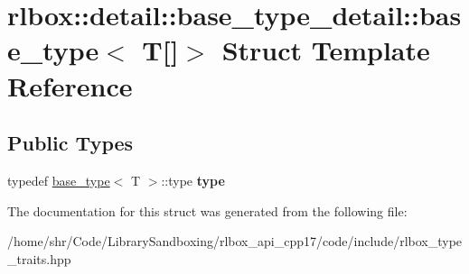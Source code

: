\hypertarget{structrlbox_1_1detail_1_1base__type__detail_1_1base__type_3_01T[]_4}{}\section{rlbox\+:\+:detail\+:\+:base\+\_\+type\+\_\+detail\+:\+:base\+\_\+type$<$ T\mbox{[}\mbox{]}$>$ Struct Template Reference}
\label{structrlbox_1_1detail_1_1base__type__detail_1_1base__type_3_01T[]_4}
\subsection*{Public Types}
\begin{DoxyCompactItemize}
\item 
\mbox{\label{structrlbox_1_1detail_1_1base__type__detail_1_1base__type_3_01T[]_4_a9d9664258521223ed1debcd068852a54}} 
typedef \hyperlink{structrlbox_1_1detail_1_1base__type__detail_1_1base__type}{base\+\_\+type}$<$ T $>$\+::type {\bfseries type}
\end{DoxyCompactItemize}


The documentation for this struct was generated from the following file\+:\begin{DoxyCompactItemize}
\item 
/home/shr/\+Code/\+Library\+Sandboxing/rlbox\+\_\+api\+\_\+cpp17/code/include/rlbox\+\_\+type\+\_\+traits.\+hpp\end{DoxyCompactItemize}
